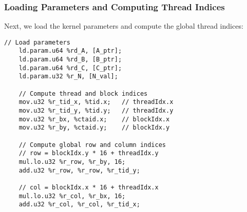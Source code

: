 \subsubsection{Loading Parameters and Computing Thread Indices}

Next, we load the kernel parameters and compute the global thread indices:

\begin{lstlisting}[style=ptx]
    // Load parameters
    ld.param.u64 %rd_A, [A_ptr];
    ld.param.u64 %rd_B, [B_ptr];
    ld.param.u64 %rd_C, [C_ptr];
    ld.param.u32 %r_N, [N_val];
    
    // Compute thread and block indices
    mov.u32 %r_tid_x, %tid.x;   // threadIdx.x
    mov.u32 %r_tid_y, %tid.y;   // threadIdx.y
    mov.u32 %r_bx, %ctaid.x;    // blockIdx.x
    mov.u32 %r_by, %ctaid.y;    // blockIdx.y
    
    // Compute global row and column indices
    // row = blockIdx.y * 16 + threadIdx.y
    mul.lo.u32 %r_row, %r_by, 16;
    add.u32 %r_row, %r_row, %r_tid_y;
    
    // col = blockIdx.x * 16 + threadIdx.x
    mul.lo.u32 %r_col, %r_bx, 16;
    add.u32 %r_col, %r_col, %r_tid_x;
\end{lstlisting}

